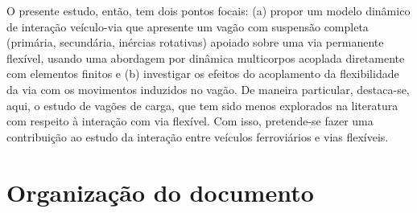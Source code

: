 O presente estudo, então, tem dois pontos focais: (a) propor um modelo dinâmico de interação veículo-via que apresente um vagão com suspensão completa (primária, secundária, inércias rotativas) apoiado sobre uma via permanente flexível, usando uma abordagem por dinâmica multicorpos acoplada diretamente com elementos finitos e (b) investigar os efeitos do acoplamento da flexibilidade da via com os movimentos induzidos no vagão. De maneira particular, destaca-se, aqui, o estudo de vagões de carga, que tem sido menos explorados na literatura com respeito à interação com via flexível. Com isso, pretende-se fazer uma contribuição ao estudo da interação entre veículos ferroviários e vias flexíveis.

\section{Organização do documento}